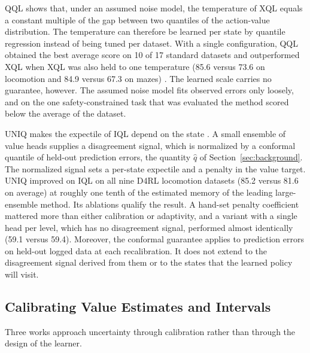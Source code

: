 \documentclass[journal]{IEEEtran}
\begin{document}
QQL shows that, under an assumed noise model, the temperature of XQL equals a constant multiple of the gap between two quantiles of the action-value distribution. The temperature can therefore be learned per state by quantile regression instead of being tuned per dataset. With a single configuration, QQL obtained the best average score on 10 of 17 standard datasets and outperformed XQL when XQL was also held to one temperature (85.6 versus 73.6 on locomotion and 84.9 versus 67.3 on mazes) \cite{gao2026qql}. The learned scale carries no guarantee, however. The assumed noise model fits observed errors only loosely, and on the one safety-constrained task that was evaluated the method scored below the average of the dataset.

UNIQ makes the expectile of IQL depend on the state \cite{upadhyay2026uniq}. A small ensemble of value heads supplies a disagreement signal, which is normalized by a conformal quantile of held-out prediction errors, the quantity $\hat{q}$ of Section~\ref{sec:background}. The normalized signal sets a per-state expectile and a penalty in the value target. UNIQ improved on IQL on all nine D4RL locomotion datasets (85.2 versus 81.6 on average) at roughly one tenth of the estimated memory of the leading large-ensemble method. Its ablations qualify the result. A hand-set penalty coefficient mattered more than either calibration or adaptivity, and a variant with a single head per level, which has no disagreement signal, performed almost identically (59.1 versus 59.4). Moreover, the conformal guarantee applies to prediction errors on held-out logged data at each recalibration. It does not extend to the disagreement signal derived from them or to the states that the learned policy will visit.

\subsection{Calibrating Value Estimates and Intervals}
Three works approach uncertainty through calibration rather than through the design of the learner.
\end{document}
